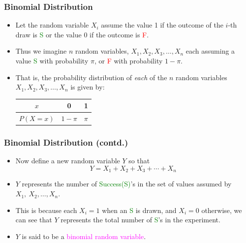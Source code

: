 \documentclass[xcolor=dvipsnames,12pt]{beamer}
\begin{document}
\begin{frame}
\frametitle{Binomial Distribution}
\begin{itemize}
\addtolength{\itemsep}{-0.6\baselineskip}
\item Let the random variable  $X_i$ assume the value 1 if the outcome of the
 $i$-th draw  is \textcolor{green}{S} or the  value 0 if the outcome  is \textcolor{red}{F}. \\[.1in]
\item Thus we imagine $n$ random variables,  $X_1, X_2, X_3, \ldots, X_n$ each assuming a 
value \textcolor{green}{S} with probability $\pi$, or \textcolor{red}{F} with probability $1 - \pi$.\\[.1in]
\item That is, the probability distribution of \textit{each} of the $n$ random variables
 $X_1, X_2, X_3, \ldots, X_n$ is given by:\\[.1in]
\begin{tabular}{|c|cc|}
\hline
$x$ & 0& 1 \\ \hline
$P(X=x)$ & $1-\pi$ & $\pi$ \\ \hline
\end{tabular}
\end{itemize}
\end{frame}




\begin{frame}
\frametitle{Binomial Distribution (contd.)}
\begin{itemize}
\addtolength{\itemsep}{-0.6\baselineskip}
\item Now define a new random variable $Y$ so that
$$
  Y = X_1 + X_2 + X_3 + \cdots + X_n \, 
$$
\item $Y$ represents the number of \textcolor{green}{Success(S)}'s in the set of values assumed by 
$X_1,\ X_2, \ldots,X_n$.  \\[.1in]
\item This is because each $X_i=1$ when an \textcolor{green}{S} is drawn,
and  $X_i=0$  otherwise, we can see that $Y$ represents the total number of 
\textcolor{green}{S}'s in the experiment. \\[.1in]
\item $Y$ is said to be a  \textcolor{magenta}{binomial random variable}.
\end{itemize}
\end{frame}
\end{document}
